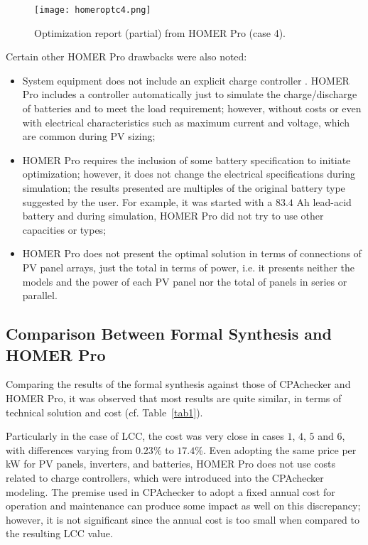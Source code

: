 \begin{figure}[h]
\texttt{[image: homeroptc4.png]}
\centering
\caption{Optimization report (partial) from HOMER Pro (case 4).}
\label{fig:homeroptc4}
\end{figure}

Certain other HOMER Pro drawbacks were also noted:

\begin{itemize}
\item System equipment does not include an explicit charge controller . HOMER Pro includes a controller automatically just to simulate the charge/discharge of batteries and to meet the load requirement; however, without costs or even with electrical characteristics such as maximum current and voltage, which are common during PV sizing;
\item HOMER Pro requires the inclusion of some battery specification to initiate optimization; however, it does not change the electrical specifications during simulation; the results presented are multiples of the original battery type suggested by the user. For example, it was started with a $83.4$ Ah lead-acid battery and during simulation, HOMER Pro did not try to use other capacities or types;
\item HOMER Pro does not present the optimal solution in terms of connections of PV panel arrays, just the total in terms of power, i.e. it presents neither the models and the power of each PV panel nor the total of panels in series or parallel.
\end{itemize}

\subsection{Comparison Between Formal Synthesis and HOMER Pro}

Comparing the results of the formal synthesis against those of CPAchecker and HOMER Pro, it was observed that most results are quite similar, 
in terms of technical solution and cost (cf. Table~\ref{tab1}). 

Particularly in the case of LCC, the cost was very close in cases $1$, $4$, $5$ and $6$, with differences varying from $0.23$\% to $17.4$\%. Even adopting the same price per kW for PV panels, inverters, and batteries, HOMER Pro does not use costs related to charge controllers, which were introduced into the CPAchecker modeling. The premise used in CPAchecker to adopt a fixed annual cost for operation and maintenance can produce some impact as well on this discrepancy; however, it is not significant since the annual cost is too small when compared to the resulting LCC value.

